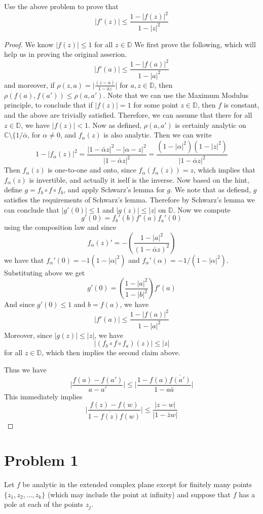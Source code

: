 \documentclass{article}[12pt]
\def\DD{\mathbb D}
\def\CC{{\mathbb C}}
\begin{document}
Use the above problem to prove that
\[
|f'(z)| \le \frac{1-|f(z)|^2}{1-|z|^2}
\]
\begin{proof}
  We  know $|f(z)| \le 1$ for all $z\in \DD$
  We first prove the following, which will help us in proving the original
  asserion.
  \[
  |f'(a)| \le \frac {1-|f(a)|^2}{1-|a|^2}
  \]
  and moreover, if $\rho(z,a) = \lvert \frac{(z-a)}{1-\bar{a}z}\rvert$ for $a,z\in \DD$,
  then $\rho(f(a),f(a'))\le \rho(a,a')$.
  Note that we can use the Maximum Modulus principle, to conclude that if $|f(z)|=1$
  for some point $z\in\DD$, then $f$ is constant, and the above are trivially
  satisfied. Therefore, we can assume that there for all $z\in\DD$, we have
  $|f(z)|< 1$. Now as defined, $\rho(a,a')$ is certainly analytic
  on $\CC\setminus\{1/\bar{\alpha}$, for $\alpha\ne 0$, and $f_\alpha(z)$ is also
  analytic. Then we can write
  \[
  1-|f_\alpha(z)|^2 = \frac{|1-\bar{\alpha}z|^2-|\alpha-z|^2}{|1-\bar{\alpha}z|^2} =
  \frac{(1-|\alpha|^2)(1-|z|^2)}{|1-\bar{\alpha}z|^2}
  \]
  Then $f_\alpha(z)$ is one-to-one and onto, since $f_\alpha(f_\alpha(z))=z$, which implies
  that $f_\alpha(z)$ is invertible, and actually it iself is the inverse. Now based
  on the hint, define $g=f_b \circ f \circ f_b$, and apply Schwarz's lemma for $g$.
  We note that as defiend, $g$ satisfies the requirements of Schwarz's lemma. Therefore
  by Schwarz's lemma we can conclude that $|g'(0)| \le 1$ and $|g(z)| \le |z|$ on
  $\DD$. Now we compute
  \[
  g'(0) = f_b'(b)f'(a)f_a'(0)
  \] using the composition law and since
  \[
  f_\alpha(z)' = -\left(\frac{1-|a|^2}{(1-\bar{\alpha}z)^2}\right)
  \]
  we have that $f_\alpha'(0)=-1(1-|\alpha|^2)$ and $f_\alpha'(\alpha)=-1/(1-|\alpha|^2)$.
  Substituting above we get
  \[
  g'(0) = \left( \frac{1-|a|^2}{1-|b|^2}\right) f'(a)
  \]
  And since $g'(0)\le 1$ and $b=f(a)$, we have
  \[
  |f'(a)| \le \frac {1-|f(a)|^2}{1-|a|^2}
  \]
  Moreover, since $|g(z)|\le |z|$, we have
  \[
  |(f_b \circ f \circ f_a)(z)| \le |z|
  \] for all $z\in\DD$, which then implies the second claim above.

  Thus we have
  \[
  \lvert \frac{f(a)-f(a')}{a-a'}\rvert \le \lvert \frac{1-f(a)\overline{f(a')}}{1-a\bar{a}}\rvert
  \]
  This immediately implies
\[
\lvert \frac{f(z)-f(w)}{1-\overline{f(z)}f(w)}\rvert \le
\frac{\lvert z-w\rvert}{\lvert 1-\bar{z}w\rvert}
\]
\end{proof}

\section*{Problem 1}
Let $f$ be analytic in the extended complex plane except for
finitely many points $\{z_1,z_2,\ldots,z_k\}$ (which may include
the point at infinity) and suppose that $f$ has a pole at each of
the points $z_j$.
\end{document}
